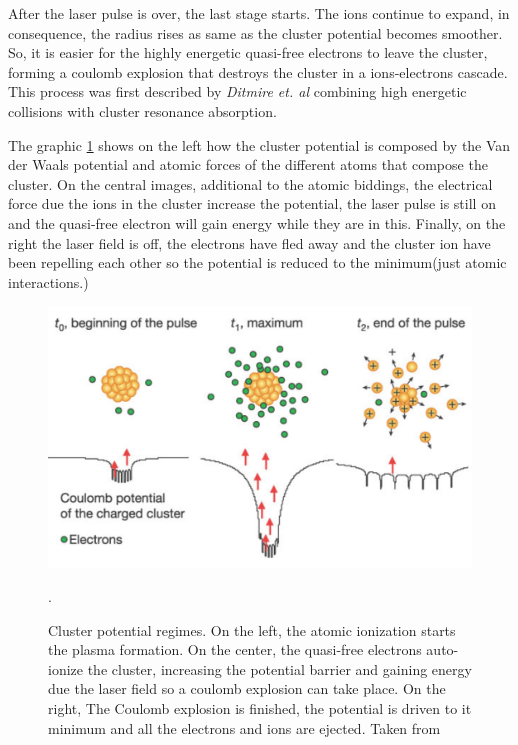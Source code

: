 After the laser pulse is over, the last stage starts. The ions continue to expand, in consequence, the radius rises as same as the cluster potential becomes smoother. So, it is easier for the highly energetic quasi-free electrons to leave the cluster, forming a coulomb explosion that destroys the cluster in a ions-electrons cascade. This process was first described by \textit{Ditmire et. al} \cite{ditmire_interaction_1996} combining high energetic collisions with cluster resonance absorption.

The graphic \ref{img:clusterpotential} shows on the left how the cluster potential is composed by the Van der Waals potential and atomic forces of the different atoms that compose the cluster. On the central images, additional to the atomic biddings, the electrical force due the ions in the cluster increase the potential, the laser pulse is still on and the quasi-free electron will gain energy while they are in this. Finally, on the right the laser field is off, the electrons have fled away and the cluster ion have been repelling each other so the potential is reduced to the minimum(just atomic interactions.)

\begin{figure}[h!] 

\centering
\includegraphics[scale=0.35]{../Images/clusterpotential.PNG}
\caption[Cluster potential regimes]{Cluster potential regimes. On the left, the atomic ionization starts the plasma formation. On the center, the quasi-free electrons auto-ionize the cluster, increasing the potential barrier and gaining energy due the laser field so a coulomb explosion can take place. On the right, The Coulomb explosion is finished, the potential is driven to it minimum and all the electrons and ions are ejected. Taken from \cite{wabnitz_multiple_2002}}.
\label{img:clusterpotential}
\end{figure}

